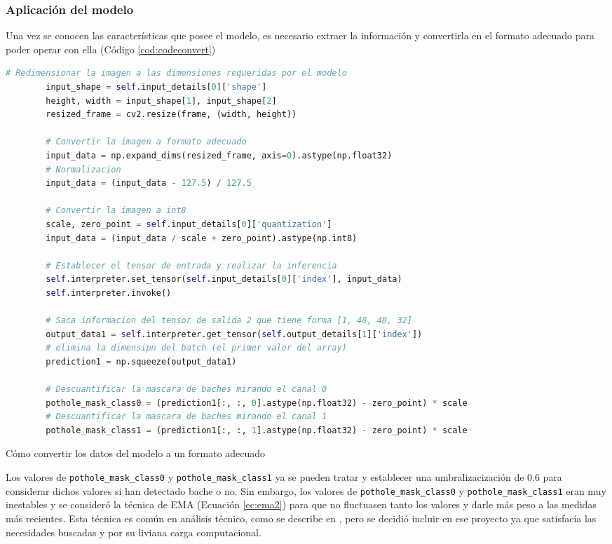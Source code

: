 \subsubsection{Aplicación del modelo}
\label{subsec:aplicacionmodelo}

Una vez se conocen las características que posee el modelo, es necesario extraer la información y convertirla en el formato adecuado para poder operar con ella (Código \ref{cod:codeconvert})

\begin{code}[h]
	\begin{lstlisting}[language=Python]
		# Redimensionar la imagen a las dimensiones requeridas por el modelo
		input_shape = self.input_details[0]['shape']
		height, width = input_shape[1], input_shape[2]
		resized_frame = cv2.resize(frame, (width, height))
		
		# Convertir la imagen a formato adecuado
		input_data = np.expand_dims(resized_frame, axis=0).astype(np.float32)
		# Normalizacion 
		input_data = (input_data - 127.5) / 127.5 
		
		# Convertir la imagen a int8
		scale, zero_point = self.input_details[0]['quantization']
		input_data = (input_data / scale + zero_point).astype(np.int8)
		
		# Establecer el tensor de entrada y realizar la inferencia
		self.interpreter.set_tensor(self.input_details[0]['index'], input_data)
		self.interpreter.invoke()
		
		# Saca informacion del tensor de salida 2 que tiene forma [1, 48, 48, 32] 
		output_data1 = self.interpreter.get_tensor(self.output_details[1]['index'])
		# elimina la dimensipn del batch (el primer valor del array)
		prediction1 = np.squeeze(output_data1)
		
		# Descuantificar la mascara de baches mirando el canal 0
		pothole_mask_class0 = (prediction1[:, :, 0].astype(np.float32) - zero_point) * scale
		# Descuantificar la mascara de baches mirando el canal 1
		pothole_mask_class1 = (prediction1[:, :, 1].astype(np.float32) - zero_point) * scale
	\end{lstlisting}
	\caption[Cómo convertir los datos del modelo a un formato adecuado]{Cómo convertir los datos del modelo a un formato adecuado}
	\label{cod:codeconvert}
\end{code}

Los valores de \verb|pothole_mask_class0| y \verb|pothole_mask_class1| ya se pueden tratar y establecer una umbralizacización de 0.6 para considerar dichos valores si han detectado bache o no. Sin embargo, los valores de \verb|pothole_mask_class0| y \verb|pothole_mask_class1| eran muy inestables y se consideró la técnica de \ac{EMA} (Ecuación \ref{ec:ema2}) para que no fluctuasen tanto los valores y darle más peso a las medidas más recientes. Esta técnica es común en análisis técnico, como se describe en \cite{6708545}, pero se decidió incluir en ese proyecto ya que satisfacía las necesidades buscadas y por su liviana carga computacional.

